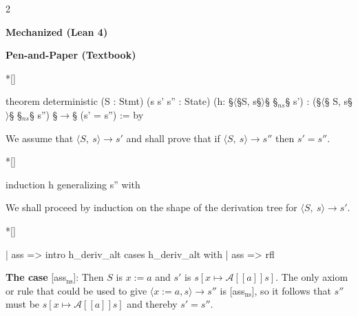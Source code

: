 \begin{paracol}{2}
\begin{leftcolumn}
    \centering \textbf{Mechanized (Lean 4)}
\end{leftcolumn}
\begin{rightcolumn}
    \centering \textbf{Pen-and-Paper (Textbook)}
\end{rightcolumn}
\vspace{1.5em}


\switchcolumn[1]*[]
\begin{leftcolumn}
    \begin{Lean_Code}
theorem deterministic
  (S : Stmt)
  (s s' s'' : State)
  (h: §\(\langle\)§S, s§\(\rangle\)§ §\to$_{ns}$§ s') :
  (§\(\langle\)§ S, s§\(\rangle\)§ §\to$_{ns}$§ s'')
  §\(\to\)§
  (s' = s'') := by
        \end{Lean_Code}
\end{leftcolumn}
\begin{rightcolumn} \noindent
We assume that \(\langle S,\ s \rangle \to s'\) and shall prove that
if \(\langle S,\ s \rangle \to s''\) then \(s' = s''\).
\end{rightcolumn}
\vspace{1em}


\switchcolumn[1]*[]
\begin{leftcolumn}
    \begin{Lean_Code}
  induction h
  generalizing s'' with
        \end{Lean_Code}
\end{leftcolumn}
\begin{rightcolumn}
We shall proceed by induction on the shape of the derivation tree for \(\langle S,\ s \rangle \to s'\).
\end{rightcolumn}
\vspace{2em}


\switchcolumn[1]*[]
\begin{leftcolumn}
    \begin{Lean_Code}
  | ass =>
    intro h_deriv_alt
    cases h_deriv_alt with
    | ass => rfl
    \end{Lean_Code}
\end{leftcolumn}
\begin{rightcolumn}
\textbf{The case} [ass$_{\text{ns}}$]: Then \(S\) is \(x := a\) and \(s'\) is \(s[x\mapsto\mathcal{A}[\![a]\!]s]\).
The only axiom or rule that could be used to give \( \langle x := a, s \rangle \to s'' \) is [ass$_{\text{ns}}$],
so it follows that \(s''\) must be \(s[x \mapsto \mathcal{A}[\![a]\!] s]\) and thereby \(s' = s''\).
\end{rightcolumn}
\vspace{2em}



\end{paracol}
